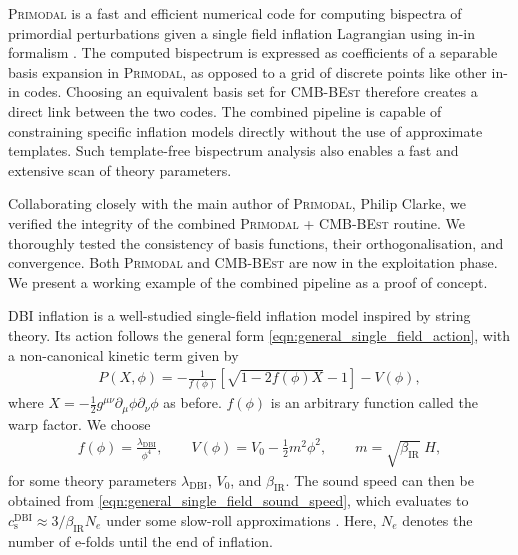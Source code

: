\textsc{Primodal} is a fast and efficient numerical code for computing bispectra of primordial perturbations given a single field inflation Lagrangian using in-in formalism \cite{Clarke2021}. The computed bispectrum is expressed as coefficients of a separable basis expansion in \textsc{Primodal}, as opposed to a grid of discrete points like other in-in codes. Choosing an equivalent basis set for \textsc{CMB-BEst} therefore creates a direct link between the two codes. The combined pipeline is capable of constraining specific inflation models directly without the use of approximate templates. Such template-free bispectrum analysis also enables a fast and extensive scan of theory parameters.

Collaborating closely with the main author of \textsc{Primodal}, Philip Clarke, we verified the integrity of the combined \textsc{Primodal} + \textsc{CMB-BEst} routine. We thoroughly tested the consistency of basis functions, their orthogonalisation, and convergence. Both \textsc{Primodal} and \textsc{CMB-BEst} are now in the exploitation phase. We present a working example of the combined pipeline as a proof of concept.

DBI inflation \cite{Silverstein2004dbi,Alishahiha2004dbi,Chen2005runningdbi,Bean2008comparingdbi} is a well-studied single-field inflation model inspired by string theory. Its action follows the general form \eqref{eqn:general_single_field_action}, with a non-canonical kinetic term given by
\begin{align}
	P(X,\phi) = - \frac{1}{f(\phi)} \left[ \sqrt{1 - 2f(\phi)X} - 1 \right] - V(\phi),
\end{align}
where $X=-\frac{1}{2} g^{\mu\nu} \partial_\mu \phi \partial_\nu \phi$ as before. $f(\phi)$ is an arbitrary function called the warp factor. We choose
\begin{align}
	f(\phi) = \frac{\lambda_\text{DBI}}{\phi^4}, \qquad V(\phi) = V_0 - \frac{1}{2}m^2\phi^2, \qquad m = \sqrt{\beta_\text{IR}} \; H,
\end{align}
for some theory parameters $\lambda_\text{DBI}$, $V_0$, and $\beta_\text{IR}$. The sound speed can then be obtained from \eqref{eqn:general_single_field_sound_speed}, which evaluates to $c^\text{DBI}_\text{s} \approx 3/\beta_\text{IR} N_e$ under some slow-roll approximations \cite{Chen2005runningdbi}. Here, $N_e$ denotes the number of e-folds until the end of inflation.

